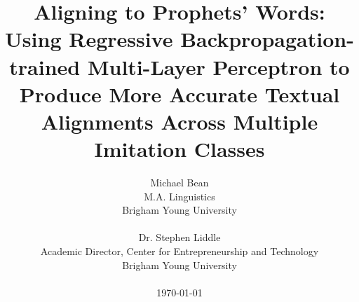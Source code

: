 \title{Aligning to Prophets' Words:\\
Using Regressive Backpropagation-trained Multi-Layer Perceptron to Produce More Accurate Textual Alignments Across Multiple Imitation Classes}

\author{Michael Bean\\
M.A. Linguistics\\
Brigham Young University\\
\\
Dr. Stephen Liddle\\
Academic Director, Center for Entrepreneurship and Technology\\
Brigham Young University\\
\\
\today
}
\maketitle
